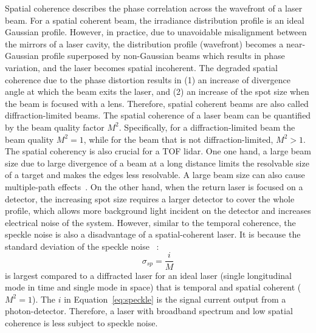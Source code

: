 Spatial coherence describes the phase correlation across the wavefront of a laser beam. For a spatial coherent beam, the irradiance distribution profile is an ideal Gaussian profile. However, in practice, due to unavoidable misalignment between the mirrors of a laser cavity, the distribution profile (wavefront) becomes a near-Gaussian profile superposed by non-Gaussian beams which results in phase variation, and the laser becomes spatial incoherent. The degraded spatial coherence due to the phase distortion results in (1) an increase of divergence angle at which the beam exits the laser, and (2) an increase of the spot size when the beam is focused with a lens. Therefore, spatial coherent beams are also called diffraction-limited beams. The spatial coherence of a laser beam can be quantified by the beam quality factor $M^2$. Specifically, for a diffraction-limited beam the beam quality $M^2=1$, while for the beam that is not diffraction-limited, $M^2>1$. The spatial coherency is also crucial for a TOF lidar. One one hand, a large beam size due to large divergence of a beam at a long distance limits the resolvable size of a target and makes the edges less resolvable. A large beam size can also cause multiple-path effects~\citep{adams2000lidar}. On the other hand, when the return laser is focused on a detector, the increasing spot size requires a larger detector to cover the whole profile, which allows more background light incident on the detector and increases electrical noise of the system. However, similar to the temporal coherence, the speckle noise is also a disadvantage of a spatial-coherent laser. It is because the standard deviation of the speckle noise ~\citep{richmond2010direct}:
\begin{equation} \label{eq:speckle}
\sigma_{sp}=\frac{i}{M}
\end{equation}
is largest compared to a diffracted laser for an ideal laser (\eg single longitudinal mode in time and single mode in space) that is temporal and spatial coherent (\ie $M^2=1$). The $i$ in Equation~\eqref{eq:speckle} is the signal current output from a photon-detector. Therefore, a laser with broadband spectrum and low spatial coherence is less subject to speckle noise.
